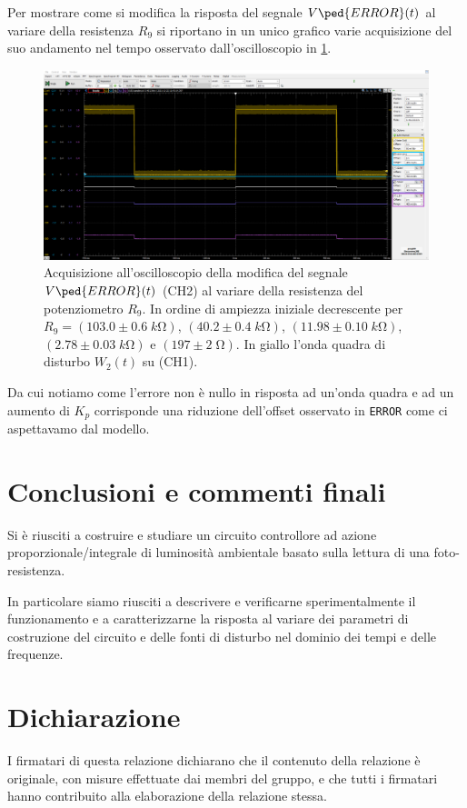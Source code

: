 \documentclass[10pt, a4paper, italian]{article}
\begin{document}
Per mostrare come si modifica la risposta del segnale $V\ped{ERROR} (t)$ al
variare della resistenza $R_9$ si riportano in un unico grafico varie
acquisizione del suo andamento nel tempo osservato dall'oscilloscopio 
in \cref{fig: propR9}.
\begin{figure}[htbp]
    \centering
	\includegraphics[width=\textwidth]{propR9}
    \caption{Acquisizione all'oscilloscopio della modifica del segnale
    $V\ped{ERROR} (t)$ (CH2) al variare della resistenza del potenziometro
    $R_9$. In ordine di ampiezza iniziale decrescente per $R_9 =
    (103.0 \pm 0.6 \; \si{k\ohm})$, $(40.2 \pm 0.4 \; \si{k\ohm})$,
    $(11.98 \pm 0.10 \; \si{k\ohm})$, $(2.78 \pm 0.03 \; \si{k\ohm})$ e
    $(197 \pm 2 \; \si{\ohm})$.
    In giallo l'onda quadra di disturbo $W_2 (t)$ su (CH1).
    \label{fig: propR9}}
\end{figure}
Da cui notiamo come l'errore non è nullo in risposta ad un'onda quadra e ad un
aumento di $K_p$ corrisponde una riduzione dell'offset osservato in
\verb+ERROR+ come ci aspettavamo dal modello.


\section*{Conclusioni e commenti finali}
Si è riusciti a costruire e studiare un circuito controllore ad azione
proporzionale/integrale di luminosità ambientale basato sulla lettura di una
foto-resistenza.

In particolare siamo riusciti a descrivere e verificarne sperimentalmente il
funzionamento e a caratterizzarne la risposta al variare dei parametri di
costruzione del circuito e delle fonti di disturbo nel dominio dei tempi e
delle frequenze.
\section*{Dichiarazione}
I firmatari di questa relazione dichiarano che il contenuto della relazione \`e
originale, con misure effettuate dai membri del gruppo, e che tutti i firmatari
hanno contribuito alla elaborazione della relazione stessa.
\end{document}

